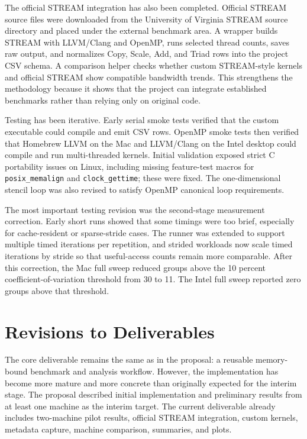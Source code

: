 \documentclass[11pt]{article}
\begin{document}
The official STREAM integration has also been completed. Official STREAM source files were downloaded from the University of Virginia STREAM source directory and placed under the external benchmark area. A wrapper builds STREAM with LLVM/Clang and OpenMP, runs selected thread counts, saves raw output, and normalizes Copy, Scale, Add, and Triad rows into the project CSV schema. A comparison helper checks whether custom STREAM-style kernels and official STREAM show compatible bandwidth trends. This strengthens the methodology because it shows that the project can integrate established benchmarks rather than relying only on original code.

Testing has been iterative. Early serial smoke tests verified that the custom executable could compile and emit CSV rows. OpenMP smoke tests then verified that Homebrew LLVM on the Mac and LLVM/Clang on the Intel desktop could compile and run multi-threaded kernels. Initial validation exposed strict C portability issues on Linux, including missing feature-test macros for \texttt{posix\_memalign} and \texttt{clock\_gettime}; these were fixed. The one-dimensional stencil loop was also revised to satisfy OpenMP canonical loop requirements.

The most important testing revision was the second-stage measurement correction. Early short runs showed that some timings were too brief, especially for cache-resident or sparse-stride cases. The runner was extended to support multiple timed iterations per repetition, and strided workloads now scale timed iterations by stride so that useful-access counts remain more comparable. After this correction, the Mac full sweep reduced groups above the 10 percent coefficient-of-variation threshold from 30 to 11. The Intel full sweep reported zero groups above that threshold.

\section{Revisions to Deliverables}

The core deliverable remains the same as in the proposal: a reusable memory-bound benchmark and analysis workflow. However, the implementation has become more mature and more concrete than originally expected for the interim stage. The proposal described initial implementation and preliminary results from at least one machine as the interim target. The current deliverable already includes two-machine pilot results, official STREAM integration, custom kernels, metadata capture, machine comparison, summaries, and plots.
\end{document}
